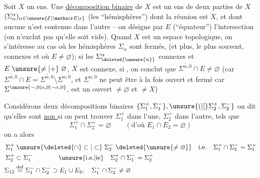 Soit $X$ un ens. Une \uline{décomposition binaire} de $X$ est un ens de deux parties de $X$ $(\Sigma_{\alpha}^{\alpha})_{\alpha\in\unsure{\mathcal E|\mathscr E|\varepsilon}}$ (les ``hémisphères'') dont la réunion est $X$, et dont  aucune n'est contenue dans l'autre -- on désigne par $E$ (``équateur'') l'intersection (on n'exclut pas qu'elle soit vide). Quand $X$ est un espace topologique, on s'intéresse au cas où les hémisphères $\Sigma_{\alpha}$ sont fermés, (et  plus, le plus souvent,  connexes  et où $E\ne\varnothing$); si les $\Sigma_{\deleted{\unsure{\alpha}}}^{\alpha}$ connexes et $E\mathrel{\unsure{\ne|+}}\varnothing$, $X$ est connexe, si ,  on conclut  que $\overline{\Sigma^{\alpha,0}}\cap E\ne\varnothing$
\reversemarginpar{}\normalmarginpar%
(car $\overline{\Sigma^{\alpha,0}}\cap E=\overline{\Sigma^{\alpha,0}}\setminus\Sigma^{\alpha,0}$, et $\Sigma^{\alpha,0}$ ne peut être à la fois ouvert et fermé car $\Sigma^{\unsure{-,0|\alpha,0|-\alpha,0}}$, est un ouvert $\ne\varnothing$ et $\ne X$)

Considérons deux décompositions binaires $\{\Sigma_1^{+},\Sigma_1^{-}\},\unsure{(|[}\Sigma_2^{+},\Sigma_2^{-}\}$   on dit qu'elles sont \uline{non } si  on peut trouver $\Sigma_1^{+}$ dans l'une, $\Sigma_2^{+}$ dans l'autre, tels que
\[
\Sigma_1^{+}\cap\Sigma_2^{+}=\varnothing\qquad(\text{d'où }E_1\cap E_2=\varnothing)
\]
on a alors
\[
\begin{aligned}
\Sigma_1^{+}&\mathrel{\unsure{\deleted{\cap}\subset|\subset}}\Sigma_2^{-}\ \deleted{\unsure{\ne\varnothing}}\quad\text{i.e.}\quad\Sigma_1^{+}\cap\Sigma_2^{-}=\Sigma_1^{+}\\
\Sigma_2^{+}&\subset\Sigma_1^{-}\qquad\qquad\text{\unsure{i.e.|ie}}\quad\Sigma_2^{+}\cap\Sigma_1^{-}=\Sigma_2^{+}\\
\Sigma_{12}&\overset{\mathrm{def}}{=}\Sigma_1^{-}\cap\Sigma_2^{-}\supset E_1\cup E_2,\quad\Sigma_1^{-}\cap\Sigma_2^{-}\ne\varnothing
\end{aligned}
\]
